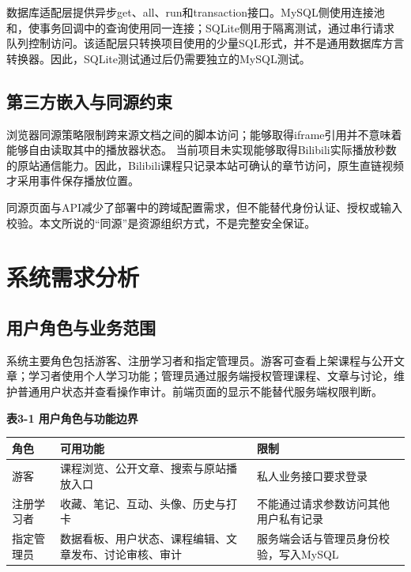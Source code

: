 \documentclass[UTF8,12pt,a4paper,oneside,openany]{ctexbook}
\begin{document}
数据库适配层提供异步get、all、run和transaction接口。MySQL侧使用连接池和，使事务回调中的查询使用同一连接；SQLite侧用于隔离测试，通过串行请求队列控制访问。该适配层只转换项目使用的少量SQL形式，并不是通用数据库方言转换器。因此，SQLite测试通过后仍需要独立的MySQL测试。


\section{第三方嵌入与同源约束}

浏览器同源策略限制跨来源文档之间的脚本访问；能够取得iframe引用并不意味着能够自由读取其中的播放器状态。\cite{ref7} 当前项目未实现能够取得Bilibili实际播放秒数的原站通信能力。因此，Bilibili课程只记录本站可确认的章节访问，原生直链视频才采用事件保存播放位置。


同源页面与API减少了部署中的跨域配置需求，但不能替代身份认证、授权或输入校验。本文所说的“同源”是资源组织方式，不是完整安全保证。


\chapter{系统需求分析}

\section{用户角色与业务范围}

系统主要角色包括游客、注册学习者和指定管理员。游客可查看上架课程与公开文章；学习者使用个人学习功能；管理员通过服务端授权管理课程、文章与讨论，维护普通用户状态并查看操作审计。前端页面的显示不能替代服务端权限判断。



\noindent\textbf{表3-1 用户角色与功能边界}

{\small
\begin{longtable}{P{0.32\textwidth}P{0.24\textwidth}P{0.32\textwidth}}
\toprule
角色 & 可用功能 & 限制 \\
\midrule
\endhead
游客 & 课程浏览、公开文章、搜索与原站播放入口 & 私人业务接口要求登录 \\
注册学习者 & 收藏、笔记、互动、头像、历史与打卡 & 不能通过请求参数访问其他用户私有记录 \\
指定管理员 & 数据看板、用户状态、课程编辑、文章发布、讨论审核、审计 & 服务端会话与管理员身份校验，写入MySQL \\
\bottomrule
\end{longtable}}
\end{document}
